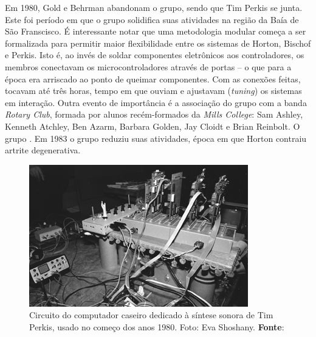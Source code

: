 Em 1980, Gold e Behrman abandonam o grupo, sendo que Tim Perkis se junta. Este foi período em que o grupo solidifica suas atividades na região da Baía de São Franscisco. É interessante notar que uma metodologia modular começa a ser formalizada para permitir maior flexibilidade entre os sistemas de Horton, Bischof e Perkis. Isto é, ao invés de soldar componentes eletrônicos aos controladores, os membros conectavam os microcontroladores através de portas -- o que para a época era arriscado ao ponto de queimar componentes. Com as conexões feitas, tocavam até três horas, tempo em que ouviam e ajustavam (\emph{tuning}) os sistemas em interação\cite[7$^o$ parágrafo]{brown_indigenous_2013}. Outra evento de importância é a associação do grupo com a banda \emph{Rotary Club}, formada por alunos recém-formados da \emph{Mills College}: Sam Ashley, Kenneth Atchley, Ben Azarm, Barbara Golden, Jay Cloidt e Brian Reinbolt. O grupo \cite[8$^o$ parágrafo]{brown_indigenous_2013}. Em 1983 o grupo reduziu suas atividades, época em que Horton contraiu artrite degenerativa.

\begin{figure}[!h]
    \centering
    \includegraphics[scale=0.7]{imagens/perkis.jpg}
    \caption{Circuito do computador caseiro dedicado à síntese sonora de Tim Perkis, usado no começo dos anos 1980. Foto: Eva Shoshany\protect\footnotemark. \textbf{Fonte}: }
    \label{fig:perkis}
  \end{figure}



